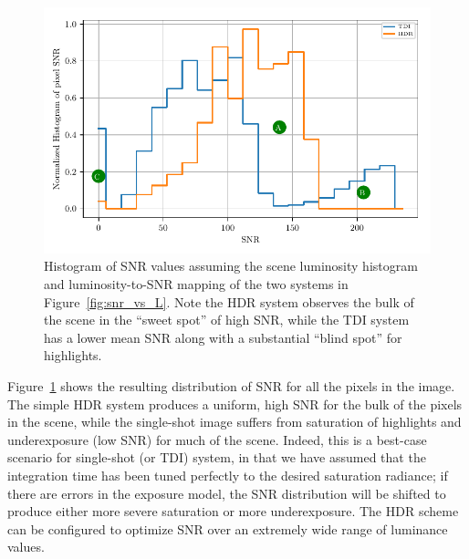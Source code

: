\documentclass[]{spieman}  %
\begin{document}
\begin{figure}
  \centering
  \includegraphics[]{figures/hist_vs_snr.pdf}
  \caption{Histogram of SNR values assuming the scene luminosity histogram and luminosity-to-SNR mapping of the two systems in Figure~\ref{fig:snr_vs_L}. Note the HDR system observes the bulk of the scene in the “sweet spot” of high SNR, while the TDI system has a lower mean SNR along with a substantial “blind spot” for highlights.  \label{fig:hist_vs_snr}}
\end{figure}

Figure~\ref{fig:hist_vs_snr} shows the resulting distribution of SNR for all the pixels in the image. The simple HDR system produces a uniform, high SNR for the bulk of the pixels in the scene, while the single-shot image suffers from saturation of highlights and underexposure (low SNR) for much of the scene. Indeed, this is a best-case scenario for single-shot (or TDI) system, in that we have assumed that the integration time has been tuned perfectly to the desired saturation radiance; if there are errors in the exposure model, the SNR distribution will be shifted to produce either more severe saturation or more underexposure. The HDR scheme can be configured to optimize SNR over an extremely wide range of luminance values.

\end{document}
